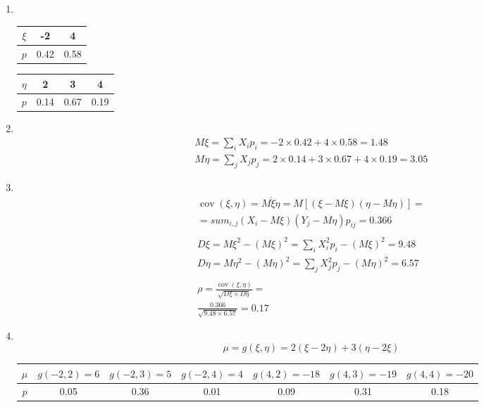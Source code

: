 \documentclass[12pt]{article}
\DeclareMathOperator{\cov}{cov}
\begin{document}
\begin{enumerate}
	\item \mbox{}\\
	      \begin{tabular}{|c|c|c|}
		      \hline
		      $\xi $ & -2   & 4    \\
		      \hline
		      $p$    & 0.42 & 0.58 \\
		      \hline
	      \end{tabular}
	      \begin{tabular}{|c|c|c|c|}
		      \hline
		      $\eta $ & 2    & 3    & 4    \\
		      \hline
		      $p$     & 0.14 & 0.67 & 0.19 \\
		      \hline
	      \end{tabular}

	\item \mbox{}\\
	      \begin{gather*}
		      M\xi = \sum_iX_ip_i = -2 \times 0.42 + 4 \times 0.58 = 1.48 \\
		      M\eta = \sum_jX_jp_j = 2 \times 0.14 + 3 \times 0.67 + 4 \times 0.19 = 3.05
	      \end{gather*}

	\item \mbox{}\\
	      \begin{gather*}
		      \cov(\xi, \eta) = M\mathring{\xi}\mathring{\eta} = M[(\xi - M\xi)(\eta - M\eta)] = \\
		      = sum_{i,j}(X_i - M\xi)(Y_j - M\eta)p_{ij} = 0.366
		      \\\\
		      D\xi = M\xi^2 - (M\xi)^2 = \sum_iX_i^2p_i - (M\xi)^2 = 9.48 \\
		      D\eta = M\eta^2 - (M\eta)^2 = \sum_jX_j^2p_j - (M\eta)^2 = 6.57
		      \\\\
		      \rho = \frac{\cov(\xi, \eta)}{\sqrt{D\xi \times D\eta}} = \\
		      \frac{0.366}{\sqrt{9.48 \times 6.57}} = 0.17
	      \end{gather*}

	\item \mbox{}\\
	      \[\mu = g(\xi, \eta) = 2(\xi - 2\eta) + 3(\eta - 2\xi)\]
	      \begin{tabular}{|c|c|c|c|c|c|c|}
		      \hline
		      $\mu$ & $g(-2, 2) = 6$  & $g(-2, 3) = 5$  & $g(-2, 4) = 4$
		            & $g(4, 2) = -18$ & $g(4, 3) = -19$ & $g(4, 4) = -20$ \\
		      \hline
		      $p$   & 0.05            & 0.36            & 0.01
		            & 0.09            & 0.31            & 0.18            \\
		      \hline
	      \end{tabular} \\


\end{enumerate}
\end{document}
